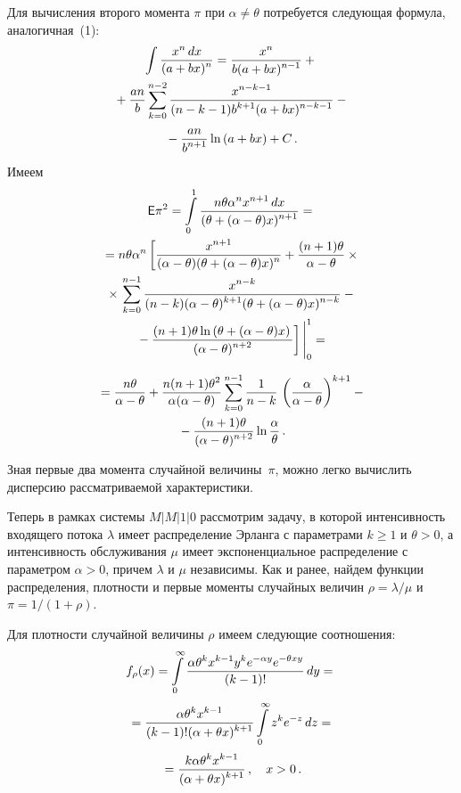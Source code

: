 \begin{multicols}{2}
Для вычисления второго момента $\pi$ при $\alpha\neq\theta$ потребуется следующая формула, аналогичная~(1):
\begin{multline}
\int\fr{x^n\, dx}{{(a+bx)^n}}=\fr{x^n}{{b(a+bx)^{n-1}}}+{}\\
{}+\fr{an}{b}\sum_{k=0}^{n-2}\fr{x^{n-k-1}}{{(n-k-1)b^{k+1}(a+bx)^{n-k-1}}}-{}\\
{}-
\fr{an}{{b^{n+1}}}\ln\left (a+bx\right )+C\,.
\end{multline}
Имеем
\begin{multline*}
\e\pi^2=\il{0}{1}\fr{n\theta\alpha^nx^{n+1}\, dx}{{(\theta+(\alpha-\theta)x)^{n+1}}}={}\\
{}=n\theta\alpha^n\left[\fr{x^{n+1}}{{(\alpha-\theta)(\theta+(\alpha-\theta)x)^n}}+{}\fr{(n+1)\theta}{{\alpha-\theta}}\times{}\right.\\
{}\times \left.
\sum_{k=0}^{n-1}\fr{x^{n-k}}{{(n-k)(\alpha-\theta)^{k+1}(\theta+(\alpha-\theta)x)^{n-k}}}-{}\right.\\
\left.{}-\fr{(n+1)\theta\ln\left (\theta+(\alpha-\theta)x\right )}{{(\alpha-\theta)^{n+2}}}\right]\Bigg|_0^1={}
\end{multline*}

\noindent
\begin{multline*}
{}=\fr{n\theta}{{\alpha-\theta}}+\fr{n(n+1)\theta^2}{{\alpha(\alpha-\theta)}}\sum_{k=0}^{n-1}\fr{1}{{n-k}}\,
\left(\fr{\alpha}{{\alpha-\theta}}\right)^{k+1}-{}\\
{}-\fr{(n+1)\theta}{{(\alpha-\theta)^{n+2}}}\ln\fr{\alpha}{\theta}\,.
\end{multline*}

Зная первые два момента случайной величины~$\pi$, можно легко вычислить дисперсию рас\-смат\-ри\-ва\-емой характеристики.

Теперь в рамках системы $M \vert M \vert 1 \vert 0$ рассмотрим задачу, в которой интенсивность входящего потока $\lambda$ имеет распределение
Эрланга с параметрами $k\ge 1$ и $\theta>0$, а интенсивность обслуживания $\mu$ имеет экспоненциальное распределение с
па\-ра\-мет\-ром $\alpha>0$, причем $\lambda$ и $\mu$ независимы. Как и ранее, найдем функции распределения, плотности и
первые моменты случайных величин
$\rho=\lambda/\mu$ и  $\pi=1/(1+\rho)$.

Для плотности случайной величины $\rho$ имеем следующие соотношения:
\begin{multline*}
f_\rho(x)=\il{0}{\infty}\fr{\alpha\theta^k x^{k-1}y^ke^{-\alpha y}e^{-\theta x y}}{{(k-1)!}}\, dy={}\\[2pt]
{}=\fr{\alpha\theta^k x^{k-1}}{{(k-1)!(\alpha+\theta x)^{k+1}}}\il{0}{\infty}z^ke^{-z}\,dz={}\\[2pt]
{}=
\fr{k\alpha\theta^k x^{k-1}}{{(\alpha+\theta x)^{k+1}}}\,,\quad x>0\,.
\end{multline*}


\end{multicols}
